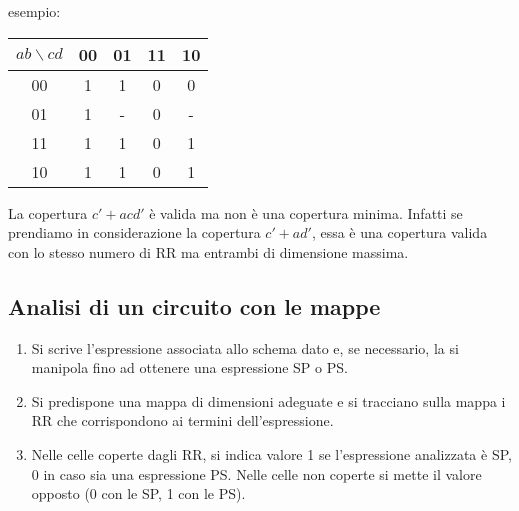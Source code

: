 \documentclass{subfiles}
\begin{document}
\noindent
esempio:

\begin{center}
\begin{tabular}{ |c|c|c|c|c| }
\hline
$ab \backslash cd$ & 00 & 01 & 11 & 10 \\
\hline
\hline
00 & 1 & 1 & 0 & 0 \\
01 & 1 & - & 0 & - \\
11 & 1 & 1 & 0 & 1 \\
10 & 1 & 1 & 0 & 1 \\
\hline
\end{tabular}
\end{center}

\noindent
La copertura $c' + acd'$ è valida ma non è una copertura minima.
Infatti se prendiamo in considerazione la copertura $c' + ad'$, essa è una copertura valida con lo stesso numero di RR ma entrambi di dimensione massima.

\subsection{Analisi di un circuito con le mappe}

\begin{enumerate}
    \item Si scrive l'espressione associata allo schema dato e, se necessario, la si manipola fino ad ottenere una espressione SP o PS.
    \item Si predispone una mappa di dimensioni adeguate e si tracciano sulla mappa i RR che corrispondono ai termini dell'espressione.
    \item Nelle celle coperte dagli RR, si indica valore 1 se l'espressione analizzata è SP, 0 in caso sia una espressione PS. Nelle celle non coperte si mette il valore opposto (0 con le SP, 1 con le PS).
\end{enumerate}
\end{document}
